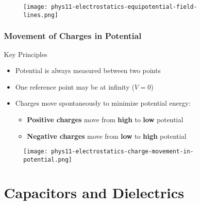 \documentclass{beamer}
\begin{document}
\begin{frame}
    
   \begin{figure}
       \centering
       \texttt{[image: phys11-electrostatics-equipotential-field-lines.png]}
   \end{figure}
    
\end{frame}

\begin{frame}
    \frametitle{Movement of Charges in Potential}
    \begin{block}{Key Principles}
        \begin{itemize}
            \item Potential is always measured between two points
            \item One reference point may be at infinity ($V = 0$)
            \item Charges move spontaneously to minimize potential energy:
                \begin{itemize}
                    \item \textbf{Positive charges} move from \textbf{high} to \textbf{low} potential
                    \item \textbf{Negative charges} move from \textbf{low} to \textbf{high} potential
                \end{itemize}
        \end{itemize}
    \end{block}
    \end{frame}

\begin{frame}
    
       \begin{figure}
           \centering
           \texttt{[image: phys11-electrostatics-charge-movement-in-potential.png]}
       \end{figure}
    
\end{frame}

\section{Capacitors and Dielectrics}
\end{document}
